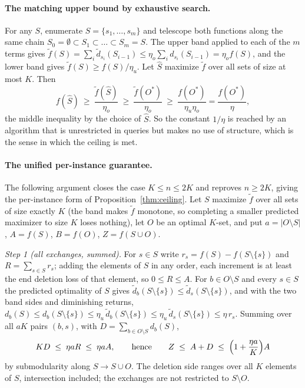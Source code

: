 \paragraph{The matching upper bound by exhaustive search.}
For any $S$, enumerate $S=\{s_1,\dots,s_m\}$ and telescope both functions
along the same chain $S_0=\emptyset\subset S_1\subset\dots\subset S_m=S$.  The
upper band applied to each of the $m$ terms gives
$\tilde f(S)=\sum_i\tilde d_{s_i}(S_{i-1})\le\eta_o\sum_id_{s_i}(S_{i-1})
=\eta_of(S)$, and the lower band gives $\tilde f(S)\ge f(S)/\eta_u$.  Let
$\hat S$ maximize $\tilde f$ over all sets of size at most $K$.  Then
\[
  f(\hat S)\ \ge\ \frac{\tilde f(\hat S)}{\eta_o}
  \ \ge\ \frac{\tilde f(O^{\ast})}{\eta_o}
  \ \ge\ \frac{f(O^{\ast})}{\eta_u\eta_o}=\frac{f(O^{\ast})}{\eta},
\]
the middle inequality by the choice of $\hat S$.  So the constant $1/\eta$ is
reached by an algorithm that is unrestricted in queries but makes no use of
structure, which is the sense in which the ceiling is met.

\paragraph{The unified per-instance guarantee.}
The following argument closes the case $K\le n\le2K$ and reproves
$n\ge2K$, giving the per-instance form of Proposition~\ref{thm:ceiling}.  Let
$S$ maximize $\tilde f$ over all sets of size exactly $K$ (the band makes
$\tilde f$ monotone, so completing a smaller predicted maximizer to size
$K$ loses nothing), let $O$ be an optimal $K$-set, and put
$a=|O\setminus S|$, $A=f(S)$, $B=f(O)$, $Z=f(S\cup O)$.

\emph{Step 1 (all exchanges, summed).}  For $s\in S$ write
$r_s=f(S)-f(S\setminus\{s\})$ and $R=\sum_{s\in S}r_s$; adding the elements
of $S$ in any order, each increment is at least the end deletion loss of
that element, so $0\le R\le A$.  For $b\in O\setminus S$ and every $s\in S$
the predicted optimality of $S$ gives
$\tilde d_b(S\setminus\{s\})\le\tilde d_s(S\setminus\{s\})$, and with the
two band sides and diminishing returns,
$d_b(S)\le d_b(S\setminus\{s\})\le\eta_u\,\tilde d_b(S\setminus\{s\})
\le\eta_u\,\tilde d_s(S\setminus\{s\})\le\eta\,r_s$.  Summing over all
$aK$ pairs $(b,s)$, with $D=\sum_{b\in O\setminus S}d_b(S)$,
\[
  KD\;\le\;\eta aR\;\le\;\eta aA,
  \qquad\text{hence}\qquad
  Z\;\le\;A+D\;\le\;\Bigl(1+\frac{\eta a}{K}\Bigr)A
\]
by submodularity along $S\to S\cup O$.  The deletion side ranges over all
$K$ elements of $S$, intersection included; the exchanges are not
restricted to $S\setminus O$.

